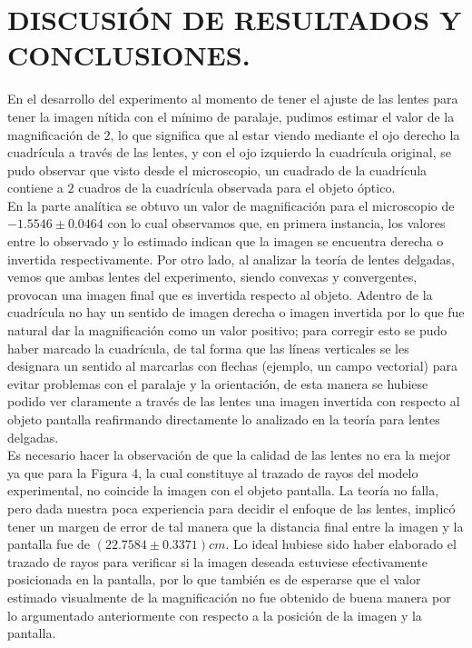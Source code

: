 \documentclass[10pt,a4paper]{article}
\begin{document}
\newpage

\section{DISCUSIÓN DE RESULTADOS Y CONCLUSIONES.} %
En el desarrollo del experimento al momento de tener el ajuste de las lentes para tener la imagen nítida con el mínimo de paralaje, pudimos estimar el valor de la magnificación de $2$, lo que significa que al estar viendo mediante el ojo derecho la cuadrícula a través de las lentes, y con el ojo izquierdo la cuadrícula original, se pudo observar que visto desde el microscopio, un cuadrado de la cuadrícula contiene a $2$ cuadros de la cuadrícula observada para el objeto óptico. \\[2mm]

En la parte analítica se obtuvo un valor de magnificación para el microscopio de $-1.5546 \pm 0.0464$ con lo cual observamos que, en primera instancia, los valores entre lo observado y lo estimado indican que la imagen se encuentra derecha o invertida respectivamente.
Por otro lado, al analizar la teoría de lentes delgadas, vemos que ambas lentes del experimento, siendo convexas y convergentes, provocan una imagen final que es invertida respecto al objeto.
Adentro de la cuadrícula no hay un sentido de imagen derecha o imagen invertida por lo que fue natural dar la magnificación como un valor positivo; para corregir esto se pudo haber marcado la cuadrícula, de tal forma que las líneas verticales se les designara un sentido al marcarlas con flechas (ejemplo, un campo vectorial) para evitar problemas con el paralaje y la orientación, de esta manera se hubiese podido ver claramente a través de las lentes una imagen invertida con respecto al objeto pantalla reafirmando directamente lo analizado en la teoría para lentes delgadas. \\[2mm]

Es necesario hacer la observación de que la calidad de las lentes no era la mejor ya que para la Figura 4, la cual constituye al trazado de rayos del modelo experimental, no coincide la imagen con el objeto pantalla.
La teoría no falla, pero dada nuestra poca experiencia para decidir el enfoque de las lentes, implicó tener un margen de error de tal manera que la distancia final entre la imagen y la pantalla fue de $(22.7584\pm0.3371)cm$.
Lo ideal hubiese sido haber elaborado el trazado de rayos para verificar si la imagen deseada estuviese efectivamente posicionada en la pantalla, por lo que también es de esperarse que el valor estimado visualmente de la magnificación no fue obtenido de buena manera por lo argumentado anteriormente con respecto a la posición de la imagen y la pantalla.
\end{document}
